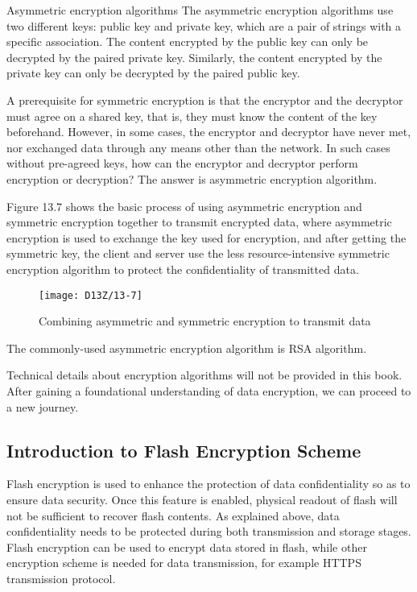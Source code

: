 \documentclass[a4paper,12pt]{book}
\begin{document}
\begin{term}{Asymmetric encryption algorithms}
    The asymmetric encryption algorithms use two different keys: public key and private key, which are a pair of strings with a specific association. The content encrypted by the public key can only be decrypted by the paired private key. Similarly, the content encrypted by the private key can only be decrypted by the paired public key.
\end{term}

A prerequisite for symmetric encryption is that the encryptor and the decryptor must agree on a shared key, that is, they must know the content of the key beforehand. However, in some cases, the encryptor and decryptor have never met, nor exchanged data through any means other than the network. In such cases without pre-agreed keys, how can the encryptor and decryptor perform encryption or decryption? The answer is asymmetric encryption algorithm.

Figure 13.7 shows the basic process of using asymmetric encryption and symmetric encryption together to transmit encrypted data, where asymmetric encryption is used to exchange the key used for encryption, and after getting the symmetric key, the client and server use the less resource-intensive symmetric encryption algorithm to protect the confidentiality of transmitted data.

\begin{figure}[!h]
    \centering
    \texttt{[image: D13Z/13-7]}
    \caption{Combining asymmetric and symmetric encryption to transmit data}
\end{figure}

The commonly-used asymmetric encryption algorithm is RSA algorithm.

Technical details about encryption algorithms will not be provided in this book. After gaining a foundational understanding of data encryption, we can proceed to a new journey.

\subsection{Introduction to Flash Encryption Scheme}
Flash encryption is used to enhance the protection of data confidentiality so as to ensure data security. Once this feature is enabled, physical readout of flash will not be sufficient to recover flash contents. As explained above, data confidentiality needs to be protected during both transmission and storage stages. Flash encryption can be used to encrypt data stored in flash, while other encryption scheme is needed for data transmission, for example HTTPS transmission protocol.
\end{document}
